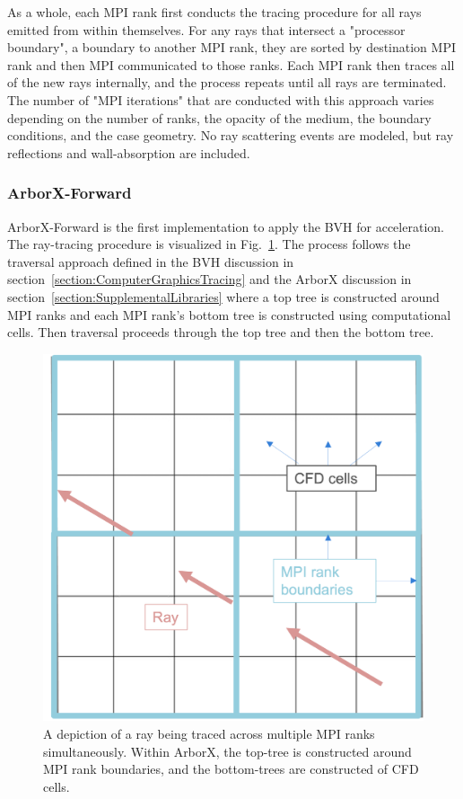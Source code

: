 As a whole, each MPI rank first conducts the tracing procedure for all rays emitted from within themselves. For any rays that intersect a "processor boundary", a boundary to another MPI rank, they are sorted by destination MPI rank and then MPI communicated to those ranks. Each MPI rank then traces all of the new rays internally, and the process repeats until all rays are terminated. The number of "MPI iterations" that are conducted with this approach varies depending on the number of ranks, the opacity of the medium, the boundary conditions, and the case geometry. No ray scattering events are modeled, but ray reflections and wall-absorption are included.


\subsubsection{ArborX-Forward}
ArborX-Forward is the first implementation to apply the BVH for acceleration. The ray-tracing procedure is visualized in Fig.~\ref{fig:FArborX_FlowChart}.
The process follows the traversal approach defined in the BVH discussion in section~\ref{section:ComputerGraphicsTracing} and the ArborX discussion in section~\ref{section:SupplementalLibraries} where a top tree is constructed around MPI ranks and each MPI rank's bottom tree is constructed using computational cells. Then traversal proceeds through the top tree and then the bottom tree.

\begin{figure}
\centering
\includegraphics[width=0.5\linewidth]{figures/ch3/DistributedRayTracing.png}
\caption{A depiction of a ray being traced across multiple MPI ranks simultaneously. Within ArborX, the top-tree is constructed around MPI rank boundaries, and the bottom-trees are constructed of CFD cells.}
\label{fig:FArborX_FlowChart}
\end{figure}

